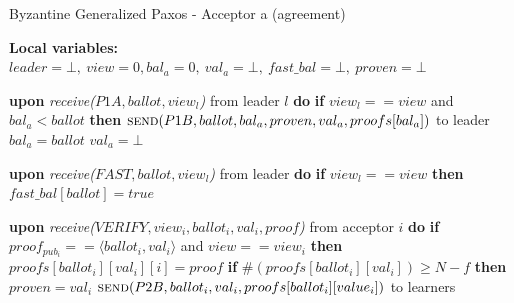 \begin{algorithm} 
	\caption{Byzantine Generalized Paxos - Acceptor a (agreement)}
	\label{BFT-Acc}
	\textbf{Local variables:} $leader = \bot,\ view = 0, bal_a = 0,\ val_a = \bot,\ fast\_bal = \bot,\ proven = \bot$
	\begin{algorithmic}[1]
		\State \textbf{upon} \textit{receive($P1A, ballot, view_l$)} from leader $l$ \textbf{do}
		\State \hspace{\algorithmicindent} \textbf{if} $view_l == view$ and $bal_a < ballot$ \textbf{then}
		\State \hspace{\algorithmicindent}\hspace{\algorithmicindent} $\Call{send}{P1B, ballot,bal_a,proven, val_a, proofs[bal_a]}$ to leader
		\State \hspace{\algorithmicindent}\hspace{\algorithmicindent} $bal_a = ballot$
		\State \hspace{\algorithmicindent}\hspace{\algorithmicindent} $val_a = \bot$	
		
		
		\State
		\State \textbf{upon} \textit{receive($FAST,ballot,view_l$)} from leader \textbf{do}
		\State \hspace{\algorithmicindent} \textbf{if} $view_l == view$ \textbf{then}
		\State \hspace{\algorithmicindent}\hspace{\algorithmicindent} $fast\_bal[ballot] = true$

		\State
		\State \textbf{upon} \textit{receive($VERIFY,view_i, ballot_i,val_i,proof$)} from acceptor $i$ \textbf{do}
		\State \hspace{\algorithmicindent} \textbf{if} $proof_{pub_i} == \langle ballot_i, val_i \rangle$ and $view == view_i$ \textbf{then}
		\State \hspace{\algorithmicindent}\hspace{\algorithmicindent} $proofs[ballot_i][val_i][i] = proof$
		\State \hspace{\algorithmicindent}\hspace{\algorithmicindent} \textbf{if} $\#(proofs[ballot_i][val_i]) \geq N-f$ \textbf{then}
		\State \hspace{\algorithmicindent}\hspace{\algorithmicindent}\hspace{\algorithmicindent} $proven = val_i$
		\State \hspace{\algorithmicindent}\hspace{\algorithmicindent}\hspace{\algorithmicindent} $\Call{send}{P2B, ballot_i, val_i, proofs[ballot_i][value_i]}$ to learners
		

\end{algorithmic}
\end{algorithm}
